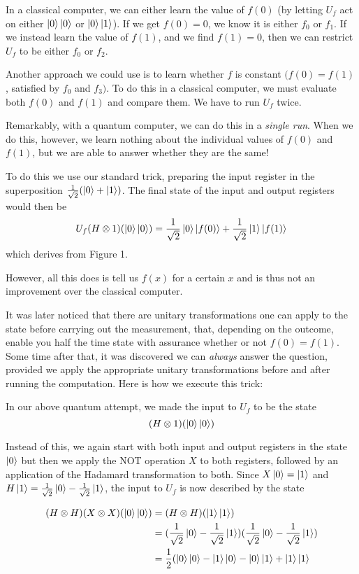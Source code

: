 \documentclass[letterpaper]{article}
\begin{document}
In a classical computer, we can either learn the value of $f(0)$ (by letting $U_{f}$ act on either $\ket{0}\ket{0}$ or $\ket{0}\ket{1}$). If we get $f(0) = 0$, we know it is either $f_{0}$ or $f_{1}$. If we instead learn the value of $f(1)$, and we find $f(1) = 0$, then we can restrict $U_{f}$ to be either $f_{0}$ or $f_{2}$. 

Another approach we could use is to learn whether $f$ is constant $\Big(f(0) = f(1)$, satisfied by $f_{0}$ and $f_{3}\Big)$. To do this in a classical computer, we must evaluate both $f(0)$ and $f(1)$ and compare them. We have to run $U_{f}$ twice. 

Remarkably, with a quantum computer, we can do this in a \textsl{single run}. When we do this, however, we learn nothing about the individual values of $f(0)$ and $f(1)$, but we are able to answer whether they are the same! 

To do this we use our standard trick, preparing the input register in the superposition $\frac{1}{\sqrt{2}} (\ket{0} + \ket{1})$. The final state of the input and output registers would then be 
$$ U_{f}(H \otimes 1)(\ket{0}\ket{0}) = \frac{1}{\sqrt{2}} \ket{0}\ket{f(0)} + \frac{1}{\sqrt{2}} \ket{1}\ket{f(1)}$$
which derives from Figure 1. 

However, all this does is tell us $f(x)$ for a certain $x$ and is thus not an improvement over the classical computer. 

It was later noticed that there are unitary transformations one can apply to the state before carrying out the measurement, that, depending on the outcome, enable you half the time state with assurance whether or not $f(0) = f(1)$. Some time after that, it was discovered we can \textsl{always} answer the question, provided we apply the appropriate unitary transformations before and after running the computation. Here is how we execute this trick: 

In our above quantum attempt, we made the input to $U_{f}$ to be the state 
$$ (H \otimes 1)(\ket{0} \ket{0})$$

Instead of this, we again start with both input and output registers in the state $\ket{0}$ but then we apply the NOT operation $X$ to both registers, followed by an application of the Hadamard transformation to both. Since $X\ket{0} = \ket{1}$ and $H\ket{1} = \frac{1}{\sqrt{2}} \ket{0} - \frac{1}{\sqrt{2}} \ket{1}$, the input to $U_{f}$ is now described by the state 

\begin{equation}
\begin{aligned}
(H \otimes H)(X \otimes X)(\ket{0} \ket{0}) & = (H \otimes H)(\ket{1} \ket{1}) \\ & = (\frac{1}{\sqrt{2}} \ket{0} - \frac{1}{\sqrt{2}} \ket{1}) (\frac{1}{\sqrt{2}} \ket{0} - \frac{1}{\sqrt{2}} \ket{1}) \\ & = \frac{1}{2} (\ket{0} \ket{0} - \ket{1} \ket{0} - \ket{0} \ket{1} + \ket{1} \ket{1}
\end{aligned}
\end{equation}
\end{document}

